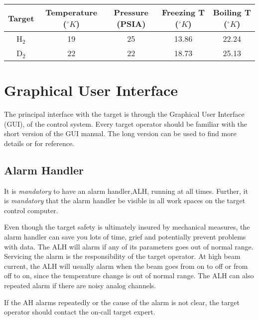 \vspace{0.3cm}

\begin{center}
\begin{tabular}{|c|c|c|c|c|}
\hline 
Target &
 Temperature (\( ^{\circ }K \))&
 Pressure (PSIA)&Freezing T (\( ^{\circ }K \))&Boiling T (\( ^{\circ }K \))\\
\hline 
H\( _{2} \)&
 19&
 25&13.86&22.24\\
\hline 
D\( _{2} \)&
 22&
 22&18.73&25.13\\
\hline 
\end{tabular}
\end{center}

\par
\vspace{0.3cm}

\section*{Graphical User Interface}

The principal interface with the target is through the
Graphical User Interface (GUI), of the control system.
Every target operator should be familiar with the
short version of the GUI manual. The long version can 
be used to find more details or for reference.
 

\subsection{Alarm Handler}

\begin{safetyen}{10}{5}
It is \emph{mandatory} to have an alarm handler,ALH, running at all times. 
Further,
it is \emph{mandatory} that the alarm handler be visible in all work spaces
on the target control computer.
\end{safetyen}
Even though the  
target safety is ultimately
insured by mechanical measures, the alarm handler can save you lots of 
time, grief and potentially prevent problems with data. 
The ALH will alarm if any of its parameters goes out of normal range. 
Servicing the alarm is the responsibility of the target operator.
At high beam current, the ALH will usually alarm when the beam goes from
on to off or from off to on, since the temperature change is out of normal
range. The ALH can also repeated alarm if there are noisy analog channels. 
\begin{safetyen}{10}{5}
If the AH alarms repeatedly or the cause of the alarm is not clear, the 
target operator should contact the on-call target expert.
\end{safetyen}

